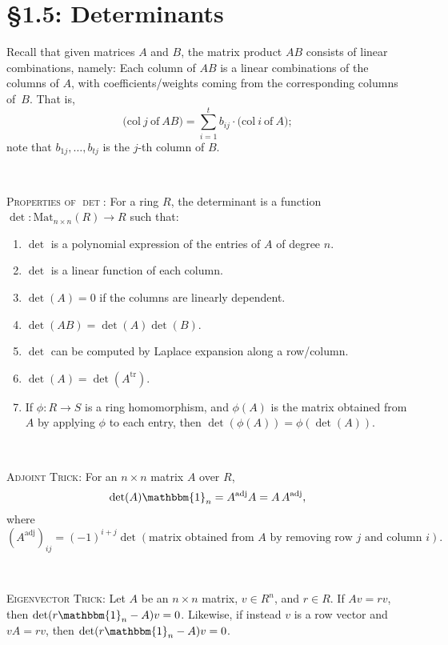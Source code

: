 \documentclass[12pt]{amsart}
\newcommand{\1}{\mathbbm{1}}
\newcommand{\tr}{\mathrm{tr}}
\newcommand{\showsol}[1]{\def\displaysol{#1}}
\begin{document}
\showsol{0}
	
	\thispagestyle{empty}
	
	\section*{\S1.5: Determinants}	

\begin{framed}
Recall that given matrices $A$ and $B$, the matrix product $AB$ consists of linear combinations, namely:
Each column of $AB$ is a linear combinations of the columns of $A$, with coefficients/weights coming from the corresponding columns of~$B$. That is,
 \[ \big(\mathrm{col} \ j \ \text{of} \ AB\big) = \sum_{i=1}^t b_{ij} \cdot  \big(\mathrm{col} \ i \ \text{of} \ A);\]
 note that $b_{1j},\dots,b_{tj}$ is the $j$-th column of $B$.

\

\noindent \textsc{Properties of $\det$:} For a ring $R$, the determinant is a function $\det: \mathrm{Mat}_{n\times n}(R) \to R$ such that:
  \begin{enumerate}
  \item $\det$ is a polynomial expression of the entries of $A$ of degree $n$.
  \item $\det$ is a linear function of each column.
  \item $\det(A)=0$ if the columns are linearly dependent.
  \item $\det(AB)=\det(A)\det(B)$.
  \item $\det$ can be computed by Laplace expansion along a row/column.
  \item $\det(A) = \det(A^\tr)$.
  \item If $\phi:R\to S$ is a ring homomorphism, and $\phi(A)$ is the matrix obtained from $A$ by applying $\phi$ to each entry, then $\det(\phi(A)) = \phi(\det(A))$.
  \end{enumerate} 


\

\textsc{Adjoint Trick:} For an $n\times n$ matrix $A$ over $R$, 
\[\det(A) \mathbbm{1}_n = A^\mathrm{adj} A = A \, A^\mathrm{adj},\] where 
  $(A^\mathrm{adj})_{ij}=(-1)^{i+j} \det( \text{matrix obtained from $A$ by removing row $j$ and column $i$}).$

\


 \noindent \textsc{Eigenvector Trick:} Let $A$ be an $n\times n$ matrix, $v\in R^n$, and $r\in R$. If $Av=rv$, then ${\det(r \1_n - A) v = 0}$. Likewise, if instead $v$ is a row vector and $v A = rv$, then $\det(r \1_n - A) v = 0$.


\end{framed}
\end{document}
